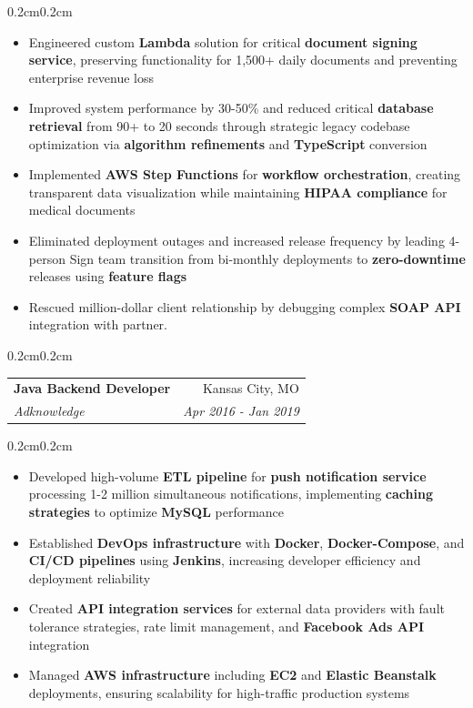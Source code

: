 \documentclass[10pt, letterpaper]{article}
\makeatletter
\newenvironment{highlights}{
    \begin{itemize}[
        topsep=0.10 cm,
        parsep=0.10 cm,
        partopsep=0pt,
        itemsep=0pt,
        leftmargin=0.4 cm + 10pt
    ]
}{
    \end{itemize}
}
\newenvironment{onecolentry}{
    \begin{adjustwidth}{0.2cm}{0.2cm}
}{
    \end{adjustwidth}
}
\newcommand{\jobentry}[4]{
    \begin{onecolentry}
        \noindent
        \begin{tabularx}{\textwidth}{@{}X r@{}}
            \textbf{#1} & #4\\
            \textit{#2} & \textit{#3}
        \end{tabularx}
        \vspace{0.05cm}
    \end{onecolentry}
}
\makeatother
\begin{document}
    \vspace{0.10cm}
    \begin{onecolentry}
        \begin{highlights}
            \item Engineered custom \textbf{Lambda} solution for critical \textbf{document signing service}, preserving functionality for 1,500+ daily documents and preventing enterprise revenue loss
            \item Improved system performance by 30-50\% and reduced critical \textbf{database retrieval} from 90+ to 20 seconds through strategic legacy codebase optimization via \textbf{algorithm refinements} and \textbf{TypeScript} conversion
            \item Implemented \textbf{AWS Step Functions} for \textbf{workflow orchestration}, creating transparent data visualization while maintaining \textbf{HIPAA compliance} for medical documents
            \item Eliminated deployment outages and increased release frequency by leading 4-person Sign team transition from bi-monthly deployments to \textbf{zero-downtime} releases using \textbf{feature flags}
            \item Rescued million-dollar client relationship by debugging complex \textbf{SOAP API} integration with partner.
        \end{highlights}
    \end{onecolentry}

    \vspace{0.3cm}
    \jobentry{Java Backend Developer}{Adknowledge}{Apr 2016 - Jan 2019}{Kansas City, MO}

    \vspace{0.10cm}
    \begin{onecolentry}
        \begin{highlights}
            \item Developed high-volume \textbf{ETL pipeline} for \textbf{push notification service} processing 1-2 million simultaneous notifications, implementing \textbf{caching strategies} to optimize \textbf{MySQL} performance
            \item Established \textbf{DevOps infrastructure} with \textbf{Docker}, \textbf{Docker-Compose}, and \textbf{CI/CD pipelines} using \textbf{Jenkins}, increasing developer efficiency and deployment reliability
            \item Created \textbf{API integration services} for external data providers with fault tolerance strategies, rate limit management, and \textbf{Facebook Ads API} integration
            \item Managed \textbf{AWS infrastructure} including \textbf{EC2} and \textbf{Elastic Beanstalk} deployments, ensuring scalability for high-traffic production systems
        \end{highlights}
    \end{onecolentry}
\end{document}
